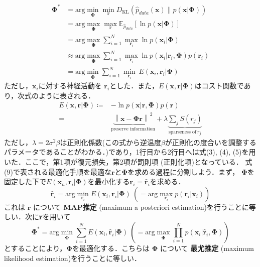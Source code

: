 \begin{align}
\mathbf{\Phi}^*&=\text{arg} \min_{\mathbf{\Phi}} \min_{\mathbf{r}} D_{\text{KL}}\left(\hat{p}_{data}(\mathbf{x}) \| p(\mathbf{x}|\mathbf{\Phi})\right)\\
&=\text{arg} \max_{\mathbf{\Phi}} \max_{\mathbf{r}} \mathbb{E}_{\hat{p}_{data}} \left[\ln p(\mathbf{x}|\mathbf{\Phi})\right]\\
&= \text{arg} \max_{\mathbf{\Phi}}\sum_{i=1}^N \max_{\mathbf{r}_i} \ln p(\mathbf{x}_i|\mathbf{\Phi})\\
&\approx \text{arg} \max_{\mathbf{\Phi}}\sum_{i=1}^N \max_{\mathbf{r}_i} \ln p(\mathbf{x}_i|\mathbf{r}_i, \mathbf{\Phi})p(\mathbf{r}_i)\\
&=\text{arg}\min_{\mathbf{\Phi}} \sum_{i=1}^N \min_{\mathbf{r}_i}\ E(\mathbf{x}_i, \mathbf{r}_i|\mathbf{\Phi})
\end{align}
ただし，$\mathbf{x}_i$に対する神経活動を $\mathbf{r}_i$とした．また，$E(\mathbf{x}, \mathbf{r}|\mathbf{\Phi})$はコスト関数であり，次式のように表される．
\begin{align}
E(\mathbf{x}, \mathbf{r}|\mathbf{\Phi})\coloneqq&-\ln p(\mathbf{x}|\mathbf{r}, \mathbf{\Phi})p(\mathbf{r})\\
=&\underbrace{\left\|\mathbf{x}-\mathbf{\Phi} \mathbf{r}\right\|^2}_{\text{preserve information}} + \lambda \underbrace{\sum_j S\left(r_j\right)}_{\text{sparseness of}\ r_j}
\end{align}
ただし，$\lambda=2\sigma^2\beta$は正則化係数(この式から逆温度$\beta$が正則化の度合いを調整するパラメータであることがわかる．)であり，1行目から2行目へは式(3), (4), (5)を用いた．ここで，第1項が復元損失，第2項が罰則項 (正則化項)となっている．
式(9)で表される最適化手順を最適な$\mathbf{r}$と$\mathbf{\Phi}$を求める過程に分割しよう．まず， $\mathbf{\Phi}$を固定した下で$E(\mathbf{x}_n, \mathbf{r}_i|\mathbf{\Phi})$を最小化する$\mathbf{r}_i=\hat{\mathbf{r}}_i$を求める．
\begin{equation}
\hat{\mathbf{r}}_i=\text{arg}\min_{\mathbf{r}_i}E(\mathbf{x}_i, \mathbf{r}_i|\mathbf{\Phi})\ \left(= \text{arg}\max_{\mathbf{r}_i}p(\mathbf{r}_i|\mathbf{x}_i)\right)
\end{equation}
これは $\mathbf{r}$ について \textbf{MAP推定} (maximum a posteriori estimation)を行うことに等しい．次に$\hat{\mathbf{r}}$を用いて
\begin{equation}
\mathbf{\Phi}^*=\text{arg}\min_{\mathbf{\Phi}} \sum_{i=1}^N E(\mathbf{x}_i, \hat{\mathbf{r}}_i|\mathbf{\Phi})\ \left(= \text{arg}\max_{\mathbf{\Phi}} \prod_{i=1}^N p(\mathbf{x}_i|\hat{\mathbf{r}}_i, \mathbf{\Phi})\right)
\end{equation}
とすることにより，$\mathbf{\Phi}$を最適化する．こちらは $\mathbf{\Phi}$ について \textbf{最尤推定} (maximum likelihood estimation)を行うことに等しい．
